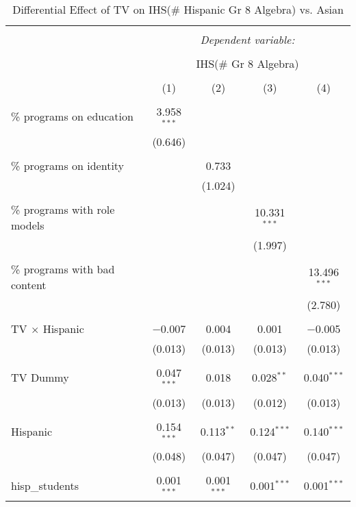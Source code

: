 
\begin{table}[!htbp] \centering 
  \caption{Differential Effect of TV on IHS(\# Hispanic Gr 8 Algebra) vs. Asian} 
  \label{} 
\begin{tabular}{@{\extracolsep{-2pt}}lcccc} 
\\[-1.8ex]\hline 
\hline \\[-1.8ex] 
 & \multicolumn{4}{c}{\textit{Dependent variable:}} \\ 
\cline{2-5} 
\\[-1.8ex] & \multicolumn{4}{c}{IHS(\# Gr 8 Algebra)} \\ 
\\[-1.8ex] & (1) & (2) & (3) & (4)\\ 
\hline \\[-1.8ex] 
 \% programs on education & 3.958$^{***}$ &  &  &  \\ 
  & (0.646) &  &  &  \\ 
  & & & & \\ 
 \% programs on identity &  & 0.733 &  &  \\ 
  &  & (1.024) &  &  \\ 
  & & & & \\ 
 \% programs with role models &  &  & 10.331$^{***}$ &  \\ 
  &  &  & (1.997) &  \\ 
  & & & & \\ 
 \% programs with bad content &  &  &  & 13.496$^{***}$ \\ 
  &  &  &  & (2.780) \\ 
  & & & & \\ 
 TV $\times$ Hispanic & $-$0.007 & 0.004 & 0.001 & $-$0.005 \\ 
  & (0.013) & (0.013) & (0.013) & (0.013) \\ 
  & & & & \\ 
 TV Dummy & 0.047$^{***}$ & 0.018 & 0.028$^{**}$ & 0.040$^{***}$ \\ 
  & (0.013) & (0.013) & (0.012) & (0.013) \\ 
  & & & & \\ 
 Hispanic & 0.154$^{***}$ & 0.113$^{**}$ & 0.124$^{***}$ & 0.140$^{***}$ \\ 
  & (0.048) & (0.047) & (0.047) & (0.047) \\ 
  & & & & \\ 
 hisp\_students & 0.001$^{***}$ & 0.001$^{***}$ & 0.001$^{***}$ & 0.001$^{***}$ \\ 

\end{tabular}
\end{table}

